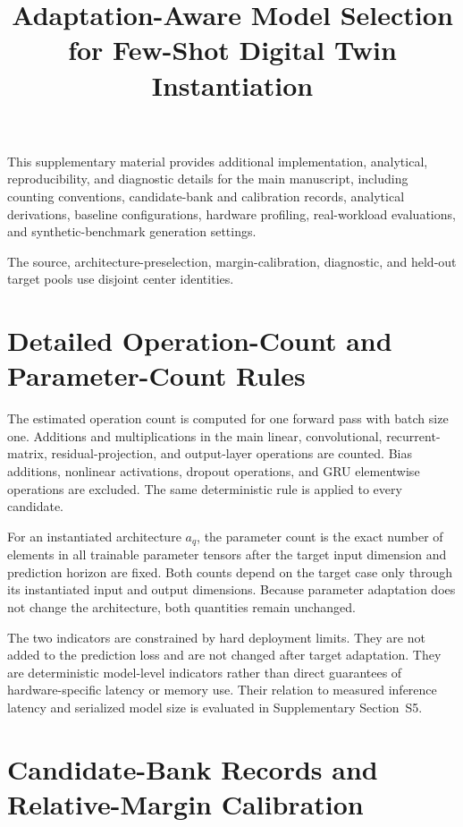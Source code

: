 \documentclass[11pt,a4paper]{article}
\title{Adaptation-Aware Model Selection for Few-Shot Digital Twin
Instantiation}
\author{}
\date{}
\begin{document}
\maketitle

This supplementary material provides additional implementation, analytical,
reproducibility, and diagnostic details for the main manuscript, including
counting conventions, candidate-bank and calibration records, analytical
derivations, baseline configurations, hardware profiling, real-workload
evaluations, and synthetic-benchmark generation settings.

The source, architecture-preselection, margin-calibration, diagnostic, and
held-out target pools use disjoint center identities.

\section{Detailed Operation-Count and Parameter-Count Rules}
\label{supp:counting}

The estimated operation count is computed for one forward pass with batch
size one. Additions and multiplications in the main linear, convolutional,
recurrent-matrix, residual-projection, and output-layer operations are
counted. Bias additions, nonlinear activations, dropout operations, and GRU
elementwise operations are excluded. The same deterministic rule is applied
to every candidate.

For an instantiated architecture $a_q$, the parameter count is the exact
number of elements in all trainable parameter tensors after the target input
dimension and prediction horizon are fixed. Both counts depend on the target
case only through its instantiated input and output dimensions. Because
parameter adaptation does not change the architecture, both quantities remain
unchanged.

The two indicators are constrained by hard deployment limits. They are not
added to the prediction loss and are not changed after target adaptation.
They are deterministic model-level indicators rather than direct guarantees
of hardware-specific latency or memory use.
Their relation to measured inference latency and serialized model size is
evaluated in Supplementary Section~S5.

\section{Candidate-Bank Records and Relative-Margin Calibration}
\label{supp:bank-calibration}
\end{document}
